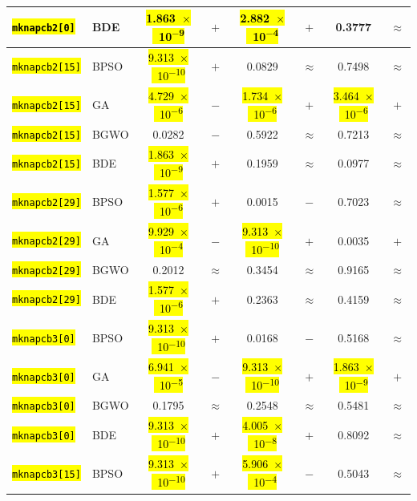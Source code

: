 \documentclass[mathematics,article,accept,moreauthors]{Definitions/mdpi}
\begin{document}
\begin{table}[H]
\begin{tabularx}{\textwidth}{Xlcccccc}
    \texttt{\hl{mknapcb2[0]}} & BDE   & \hl{1.863~$\times$~10\textsuperscript{$-$9}} & $+$ & \hl{2.882~$\times$~10\textsuperscript{$-$4}} & $+$ &    0.3777 & $\approx$ \\
    \midrule
    \texttt{\hl{mknapcb2[15]}} & BPSO  & \hl{9.313~$\times$~10\textsuperscript{$-$10}} & $+$ &    0.0829 & $\approx$ &    0.7498 & $\approx$ \\
    \texttt{\hl{mknapcb2[15]}} & GA    & \hl{4.729~$\times$~10\textsuperscript{$-$6}} & $-$ & \hl{1.734~$\times$~10\textsuperscript{$-$6}} & $+$ & \hl{3.464~$\times$~10\textsuperscript{$-$6}} & $+$ \\
    \texttt{\hl{mknapcb2[15]}} & BGWO  &    0.0282 & $-$ &    0.5922 & $\approx$ &    0.7213 & $\approx$ \\
    \texttt{\hl{mknapcb2[15]}} & BDE   & \hl{1.863~$\times$~10\textsuperscript{$-$9}} & $+$ &    0.1959 & $\approx$ &    0.0977 & $\approx$ \\
    \midrule
    \texttt{\hl{mknapcb2[29]}} & BPSO  & \hl{1.577~$\times$~10\textsuperscript{$-$6}} & $+$ &    0.0015 & $-$ &    0.7023 & $\approx$ \\
    \texttt{\hl{mknapcb2[29]}} & GA    & \hl{9.929~$\times$~10\textsuperscript{$-$4}} & $-$ & \hl{9.313~$\times$~10\textsuperscript{$-$10}} & $+$ &    0.0035 & $+$ \\
    \texttt{\hl{mknapcb2[29]}} & BGWO  &    0.2012 & $\approx$ &    0.3454 & $\approx$ &    0.9165 & $\approx$ \\
    \texttt{\hl{mknapcb2[29]}} & BDE   & \hl{1.577~$\times$~10\textsuperscript{$-$6}} & $+$ &    0.2363 & $\approx$ &    0.4159 & $\approx$ \\
    \midrule
    \texttt{\hl{mknapcb3[0]}} & BPSO  & \hl{9.313~$\times$~10\textsuperscript{$-$10}} & $+$ &    0.0168 & $-$ &    0.5168 & $\approx$ \\
    \texttt{\hl{mknapcb3[0]}} & GA    & \hl{6.941~$\times$~10\textsuperscript{$-$5}} & $-$ & \hl{9.313~$\times$~10\textsuperscript{$-$10}} & $+$ & \hl{1.863~$\times$~10\textsuperscript{$-$9}} & $+$ \\
    \texttt{\hl{mknapcb3[0]}} & BGWO  &    0.1795 & $\approx$ &    0.2548 & $\approx$ &    0.5481 & $\approx$ \\
    \texttt{\hl{mknapcb3[0]}} & BDE   & \hl{9.313~$\times$~10\textsuperscript{$-$10}} & $+$ & \hl{4.005~$\times$~10\textsuperscript{$-$8}} & $+$ &    0.8092 & $\approx$ \\
    \midrule
    \texttt{\hl{mknapcb3[15]}} & BPSO  & \hl{9.313~$\times$~10\textsuperscript{$-$10}} & $+$ & \hl{5.906~$\times$~10\textsuperscript{$-$4}} & $-$ &    0.5043 & $\approx$ \\

\end{tabularx}
\end{table}
\end{document}
